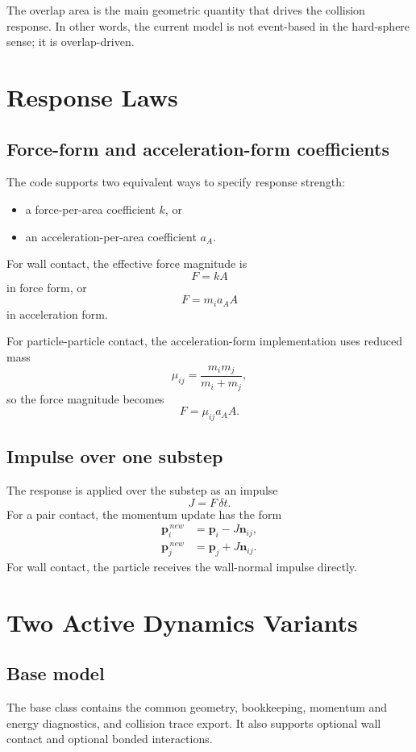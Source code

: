 \documentclass[11pt]{article}
\begin{document}
The overlap area is the main geometric quantity that drives the collision response. In other words, the current model is not event-based in the hard-sphere sense; it is overlap-driven.

\section{Response Laws}
\subsection{Force-form and acceleration-form coefficients}
The code supports two equivalent ways to specify response strength:
\begin{itemize}[leftmargin=1.5em]
    \item a force-per-area coefficient $k$, or
    \item an acceleration-per-area coefficient $a_A$.
\end{itemize}

For wall contact, the effective force magnitude is
\[
    F = k A
\]
in force form, or
\[
    F = m_i a_A A
\]
in acceleration form.

For particle-particle contact, the acceleration-form implementation uses reduced mass
\[
    \mu_{ij} = \frac{m_i m_j}{m_i + m_j},
\]
so the force magnitude becomes
\[
    F = \mu_{ij} a_A A.
\]

\subsection{Impulse over one substep}
The response is applied over the substep as an impulse
\[
    J = F \, \delta t.
\]
For a pair contact, the momentum update has the form
\begin{align*}
    \mathbf{p}_i^{\,new} &= \mathbf{p}_i - J \mathbf{n}_{ij}, \\
    \mathbf{p}_j^{\,new} &= \mathbf{p}_j + J \mathbf{n}_{ij}.
\end{align*}
For wall contact, the particle receives the wall-normal impulse directly.

\section{Two Active Dynamics Variants}
\subsection{Base model}
The base class contains the common geometry, bookkeeping, momentum and energy diagnostics, and collision trace export. It also supports optional wall contact and optional bonded interactions.
\end{document}
